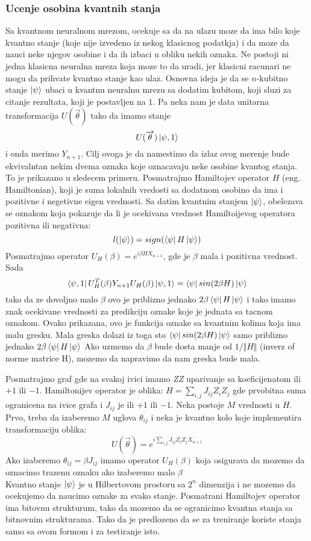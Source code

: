 \documentclass[12pt, letterpaper, oneside]{article}
\begin{document}
\subsubsection{Ucenje osobina kvantnih stanja}
Sa kvantnom neuralnom mrezom, ocekuje sa da na ulazu moze da ima bilo koje kvantno stanje (koje nije izvedeno iz nekog klasicnog podatkja)
i da moze da nauci neke njegov osobine i da ih izbaci u obliku nekih oznaka. Ne postoji ni jedna klasicna neuralna mreza koja moze to da uradi, jer klasicni racunari ne mogu da prihvate kvantno stanje kao ulaz.
Osnovna ideja je da se $n$-kubitno stanje $\Ket{\psi}$ ubaci u kvantnu neuralnu mrezu sa dodatim kubitom, koji sluzi za citanje rezultata, koji je postavljen na $1$.
Pa neka nam je data unitarna transformacija $U(\overrightarrow{\theta})$ tako da imamo stanje
\[
    U(\overrightarrow{\theta})\Ket{\psi,1}
\] 
i onda merimo $Y_{n+1}$. Cilj ovoga je da namestimo da izlaz ovog merenje bude ekvivalntan nekim dvema oznaka koje oznacavaju neke osobine kvantog stanja.
To je prikazano u sledecem primeru.
Posmatrajmo Hamiltojev operator $H$ (eng. Hamiltonian), koji je suma lokalnih vredosti sa dodatnom osobino da ima i pozitivne i negetivne eigen vrednosti.
Sa datim kvantnim stanjem $\ket{\psi}$, obelezava se oznakom koja pokazuje da li je ocekivana vrednost Hamiltoijevog operatora pozitivna ili negativna:
\[
    l(\Ket{\psi}) = sign(\bra{\psi}H\Ket{\psi})
\]
Posmatrajmo operator $U_H(\beta) = e^{i\beta HX_{n+1}}$, gde je $\beta$ mala i pozitivna vrednost. Sada
\[
    \Bra{\psi,1}U_H^T(\beta)Y_{n+1}U_H(\beta)\Ket{\psi,1} = \bra{\psi}sin(2\beta H)\Ket{\psi}
\]
tako da ze dovoljno malo $\beta$ ovo je priblizno jednako $2\beta\bra{\psi}H\Ket{\psi}$ i tako imamo znak ocekivane vrednosti za 
predikciju oznake koje je jednata sa tacnom oznakom. Ovako prikazana, ovo je funkcija oznake sa kvantnim kolima koja
ima malu gresku. Mala greska dolazi iz toga sto $\bra{\psi}sin(2\beta H)\Ket{\psi}$ samo priblizno jednako $2\beta\bra{\psi}H\Ket{\psi}$
Ako uzmemo da $\beta$ bude dosta manje od $1/\Vert H \Vert$ (inverz of norme matrice H), mozemo da napravimo da nam greska bude mala.

Posmatrajmo graf gde na svakoj ivici imamo \textit{ZZ} uparivanje sa koeficijenatom ili $+1$ ili $-1$.
Hamiltonijev operator je oblika: $H = \sum_{i,j}J_{ij}Z_iZ_j$ gde prvobitna suma ogranicena na ivice grafa i $J_{ij}$ je ili $+1$ ili $-1$.
Neka postoje $M$ vrednosti u $H$. Prvo, treba da izaberemo $M$ uglova $\theta_{ij}$ i neka je kvantno kolo koje implementira transformaciju oblika:
\[
    U(\overrightarrow{\theta}) = e^{i\sum_{i,j}J_{ij}Z_iZ_jX_{n+1}}
\]
Ako izaberemo $\theta_{ij}=\beta J_{ij}$ imamo operator $U_H(\beta)$ koja osigurava da mozemo da oznacimo trazenu oznaku
ako izaberemo malo $\beta$ \\
Kvantno stanje $\Ket{\psi}$ je u Hilbertovom prostoru sa $2^n$ dimenzija i ne mozemo da ocekujemo da naucimo oznake za svako stanje.
Posmatrani Hamiltojev operator ima bitovnu strukturum, tako da mozemo da se ogranicimo kvantna stanja sa bitnovnim strukturama.
Tako da je predlozeno da se za treniranje koriste stanja samo sa ovom formom i za testiranje isto.
\newpage
\printbibliography
\end{document}
